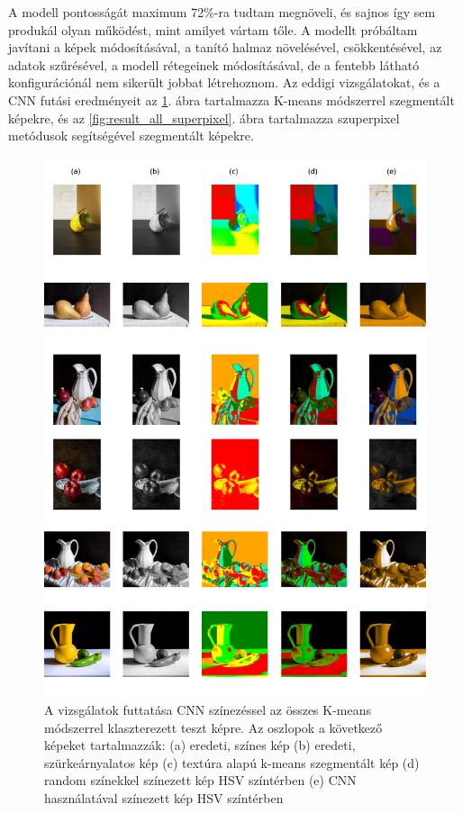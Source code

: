 A modell pontosságát maximum 72\%-ra tudtam megnöveli, és sajnos így sem produkál olyan működést, mint amilyet vártam tőle. A modellt próbáltam javítani a képek módosításával, a tanító halmaz növelésével, csökkentésével, az adatok szűrésével, a modell rétegeinek módosításával, de a fentebb látható konfigurációnál nem sikerült jobbat létrehoznom. Az eddigi vizsgálatokat, és a CNN futási eredményeit az \ref{fig:result_all_kmeans}. ábra tartalmazza K-means módszerrel szegmentált képekre, és az \ref{fig:result_all_superpixel}. ábra tartalmazza szuperpixel metódusok segítségével szegmentált képekre.

\begin{figure}[h]
\centering
\includegraphics[scale=0.5]{images/result_all_kmeans.png}
\caption{A vizsgálatok futtatása CNN színezéssel az összes K-means módszerrel klaszterezett teszt képre. Az oszlopok a következő képeket tartalmazzák: (a) eredeti, színes kép (b) eredeti, szürkeárnyalatos kép (c) textúra alapú k-means szegmentált kép (d) random színekkel színezett kép HSV színtérben (e) CNN használatával színezett kép HSV színtérben }
\label{fig:result_all_kmeans}
\end{figure}

